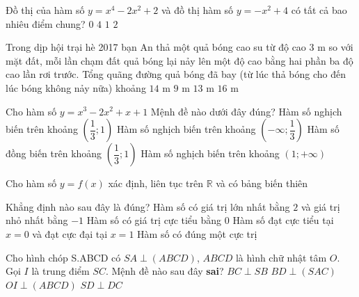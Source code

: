 		
\begin{ex}%
	Đồ thị của hàm số $ y =x^4- 2x^2+ 2 $ và đồ thị hàm số $y=-x^2+4$ có tất cả bao nhiêu điểm chung?
	\choice
	{$0$}
	{$4$}
	{$1$}
	{\True $2$}
\end{ex}
\begin{ex}%
	Trong dịp hội trại hè 2017 bạn An thả một quả bóng cao su từ độ cao $3$ m so với mặt đất, mỗi lần chạm đất quả bóng lại nảy lên một độ cao bằng hai phần ba độ cao lần rơi trước. Tổng quãng đường quả bóng đã bay (từ lúc thả bóng cho đến lúc bóng không nảy nữa) khoảng
	\choice
	{$14$ m}
	{\True $9$ m}
	{$13$ m}
	{$16$ m}
\end{ex}
\begin{ex}%
	Cho hàm số $y=x^3-2x^2+x+1$ Mệnh đề nào dưới đây đúng?
	\choice
	{\True Hàm số nghịch biến trên khoảng $
		\left(\dfrac{1}{3};1\right)$}
	{Hàm số nghịch biến trên khoảng $\left(-\infty ;\dfrac{1}{3}\right)$}
	{Hàm số đồng biến trên khoảng $\left(\dfrac{1}{3};1\right)$}
	{Hàm số nghịch biến trên khoảng $(1;+\infty)$}
\end{ex}
\begin{ex}%
	Cho hàm số $y=f(x)$ xác định, liên tục trên $\mathbb{R}$ và có bảng biến thiên
\begin{center}
\end{center}
Khẳng định nào sau đây là đúng?
	\choice
	{Hàm số có giá trị lớn nhất bằng $2$ và giá trị nhỏ nhất bằng $-1$}
	{Hàm số có giá trị cực tiểu bằng $0$}
	{\True Hàm số đạt cực tiểu tại $x=0$ và đạt cực đại tại $x=1$}
	{Hàm số có đúng một cực trị}
\end{ex}
\begin{ex}%
	Cho hình chóp S.ABCD có $ SA \perp ({ABCD})$, $ABCD$ là hình chữ nhật tâm $O$. Gọi $I$ là trung điểm $SC$. Mệnh đề nào sau đây \textbf{sai}?
	\choice
	{$ BC \perp SB $}
	{\True $ BD \perp ({SAC})$}
	{$ OI \perp ({ABCD})$}
	{$ SD \perp DC $}
\end{ex}

